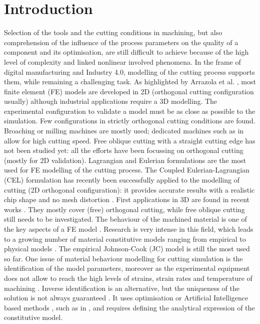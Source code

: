 \documentclass[final,5p,times,twocolumn]{elsarticle}
\begin{document}
\section{Introduction}
\label{Intro}

Selection of the tools and the cutting conditions in machining, but also comprehension of the influence of the process parameters on the quality of a component and its optimisation, are still difficult to achieve because of the high level of complexity and linked nonlinear involved phenomena. In the frame of digital manufacturing and Industry 4.0, modelling of the cutting process supports them, while remaining a challenging task. As highlighted by Arrazola et al. \cite{arrazola_recent_2013}, most finite element (FE) models are developed in 2D (orthogonal cutting configuration usually) although industrial applications require a 3D modelling.
The experimental configuration to validate a model must be as close as possible to the simulation. Few configurations in strictly orthogonal cutting conditions are found. Broaching \cite{abouridouane_friction_2021} or milling \cite{sela_measurement_2021, ducobu_experimental_2015} machines are mostly used; dedicated machines such as in \cite{afrasiabi_numerical-experimental_2021} allow for high cutting speed. Free oblique cutting with a straight cutting edge has not been studied yet: all the efforts have been focussing on orthogonal cutting (mostly for 2D validation).
Lagrangian and Eulerian formulations are the most used for FE modelling of the cutting process. The Coupled Eulerian-Lagrangian (CEL) formulation has recently been successfully applied to the modelling of cutting (2D orthogonal configuration): it provides accurate results with a realistic chip shape and no mesh distortion \cite{ducobu_application_2016}. First applications in 3D are found in recent works \cite{xu_simulation_2021, ducobu_finite_2017, ambrosio_new_2022, vovk_finite_2020, hardt_three_2021}. They mostly cover (free) orthogonal cutting, while free oblique cutting still needs to be investigated.
The behaviour of the machined material is one of the key aspects of a FE model \cite{arrazola_recent_2013, melkote_advances_2017}. Research is very intense in this field, which leads to a growing number of material constitutive models ranging from empirical to physical models \cite{melkote_advances_2017}. The empirical Johnson-Cook (JC) model \cite{johnson_constitutive_1983} is still the most used so far. One issue of material behaviour modelling for cutting simulation is the identification of the model parameters, moreover as the experimental equipment does not allow to reach the high levels of strains, strain rates and temperature of machining \cite{melkote_advances_2017}. Inverse identification is an alternative, but the uniqueness of the solution is not always guaranteed \cite{arrazola_recent_2013}. It uses optimisation or Artificial Intelligence based methods \cite{melkote_advances_2017}, such as in \cite{hardt_investigations_2021}, and requires defining the analytical expression of the constitutive model.
\end{document}
